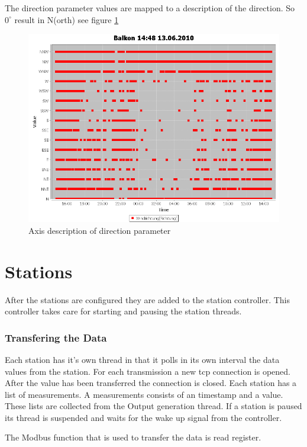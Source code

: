 The direction parameter values are mapped to a description of the direction. So $0^\circ$ result in N(orth) see figure \ref{fig:dir}
\begin{figure}[ht]
    \centering
    \includegraphics[width=0.9\linewidth]{master/plot_dir.png}
    \caption{Axis description of direction parameter}
    \label{fig:dir}
\end{figure}

\section{Stations} %
\label{sec:stations}

After the stations are configured they are added to the station controller. This controller takes care for starting and pausing the station threads. 

\subsubsection{Transfering the Data} %
\label{ssub:getting_the_data}
Each station has it's own thread in that it polls in its own interval the data values from the station. For each transmission a new tcp connection is opened. After the value has been transferred the connection is closed. Each station has a list of measurements. A measurements consists of an timestamp and a value. These lists are collected from the Output generation thread. If a station is paused its thread is suspended and waits for the wake up signal from the controller. 

The Modbus function that is used to transfer the data is read register.

